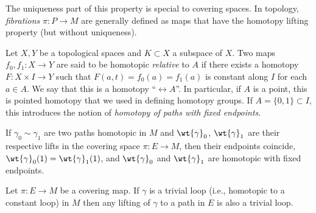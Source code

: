 The uniqueness part of this property is special to covering spaces. In topology, \emph{fibrations} $\pi: P\to M$  are generally defined as maps that have the homotopy lifting property (but without uniqueness).

\begin{defn}
    Let $X,Y$ be a topological spaces and $K\subset X$ a subspace of $X$. Two maps $f_0,f_1:X\to Y$ are said to be homotopic \emph{relative} to $A$ if there exists a homotopy $F:X\times I\to Y$ such that $F(a,t)=f_0(a)=f_1(a)$ is constant along $I$ for each $a\in A$. We say that this is a homotopy ``$\rel A$''. In particular, if $A$ is a point, this is pointed homotopy that we used in defining homotopy groups. If $A=\{0,1\}\subset I$, this introduces the notion of \emph{homotopy of paths with fixed endpoints}.
\end{defn}
\begin{cor}\label{cor 3.5 Bredon}
    If $\gamma_0\sim \gamma_1$ are two paths homotopic in $M$ and $\wt{\gamma}_0$, $\wt{\gamma}_1$ are their respective lifts in the covering space $\pi:E\to M$, then their endpoints coincide, $\wt{\gamma}_0(1)=\wt{\gamma}_1(1)$, and $\wt{\gamma}_0$ and $\wt{\gamma}_1$ are homotopic with fixed endpoints.
\end{cor}
\begin{cor}
    Let $\pi:E\to M$ be a covering map. If $\gamma$ is a trivial loop (i.e., homotopic to a constant loop) in $M$ then any lifting of $\gamma$ to a path in $E$ is also a trivial loop.
\end{cor}

